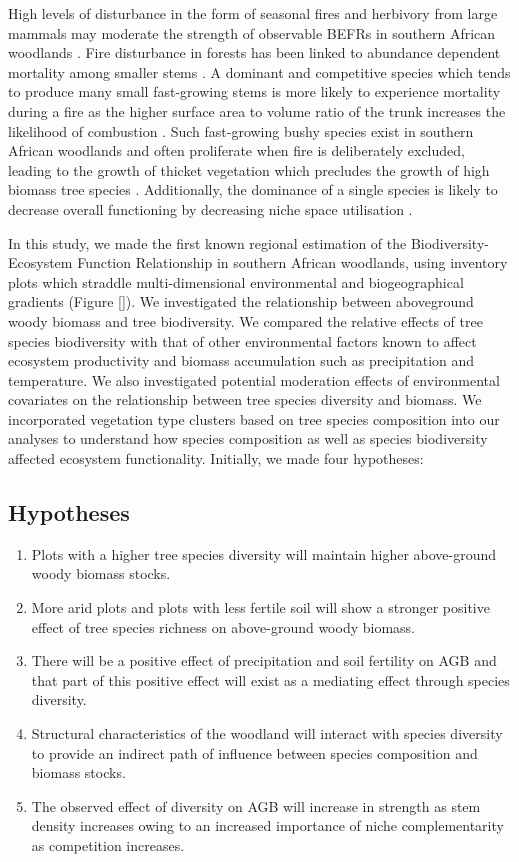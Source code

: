 \documentclass[11pt,a4paper]{article}
\begin{document}
High levels of disturbance in the form of seasonal fires and herbivory from large mammals may moderate the strength of observable BEFRs in southern African woodlands \citep{Staver2009, Bond2005}. Fire disturbance in forests has been linked to abundance dependent mortality among smaller stems \citep{Roques2001}. A dominant and competitive species which tends to produce many small fast-growing stems is more likely to experience mortality during a fire as the higher surface area to volume ratio of the trunk increases the likelihood of combustion \citep{}. Such fast-growing bushy species exist in southern African woodlands and often proliferate when fire is deliberately excluded, leading to the growth of thicket vegetation which precludes the growth of high biomass tree species \citep{Higgins2007}. Additionally, the dominance of a single species is likely to decrease overall functioning by decreasing niche space utilisation \citep{Cardinale2002}.

In this study, we made the first known regional estimation of the Biodiversity-Ecosystem Function Relationship in southern African woodlands, using inventory plots which straddle multi-dimensional environmental and biogeographical gradients (Figure \autoref{}). We investigated the relationship between aboveground woody biomass and tree biodiversity. We compared the relative effects of tree species biodiversity with that of other environmental factors known to affect ecosystem productivity and biomass accumulation such as precipitation and temperature. We also investigated potential moderation effects of environmental covariates on the relationship between tree species diversity and biomass. We incorporated vegetation type clusters based on tree species composition \citep{} into our analyses to understand how species composition as well as species biodiversity affected ecosystem functionality. Initially, we made four hypotheses: 

\subsection{Hypotheses}

\begin{enumerate}
	\item{Plots with a higher tree species diversity will maintain higher above-ground woody biomass stocks.}
	\item{More arid plots and plots with less fertile soil will show a stronger positive effect of tree species richness on above-ground woody biomass.} 
	\item{There will be a positive effect of precipitation and soil fertility on AGB and that part of this positive effect will exist as a mediating effect through species diversity.}
	\item{Structural characteristics of the woodland will interact with species diversity to provide an indirect path of influence between species composition and biomass stocks.}
	\item{The observed effect of diversity on AGB will increase in strength as stem density increases owing to an increased importance of niche complementarity as competition increases.}
\end{enumerate}
\end{document}
